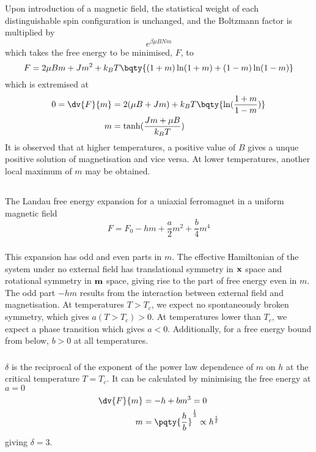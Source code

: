 \documentclass[12pt]{article}
\begin{document}
        \subsubsection{} Upon introduction of a magnetic field, the statistical weight of each distinguishable spin configuration is unchanged, and the Boltzmann factor is multiplied by \[
            e^{ \beta \mu B N m}
        \]
        which takes the free energy to be minimised, \(F\), to \[
            F = 2\mu Bm + Jm^2 + k_BT\bqty{(1 + m)\ln(1 + m) +(1 - m)\ln(1 - m)}
        \]
        which is extremised at \begin{align*}
            0 = \dv{F}{m} &= 2(\mu B + Jm) + k_BT\bqty{\ln(\frac{1 + m}{1 - m})}\\
            m &= \tanh(\frac{Jm + \mu B}{k_BT}) 
        \end{align*}
        It is observed that at higher temperatures, a positive value of \(B\) gives a unque positive solution of magnetisation and vice versa. At lower temperatures, another local maximum of \(m\) may be obtained.
        \subsection{} The Landau free energy expansion for a uniaxial ferromagnet in a uniform magnetic field  \[
            F = F_0 - hm + \frac{a}{2}m^2 + \frac{b}{4}m^4
        \]
        \subsubsection{} This expansion has odd and even parts in \(m\). The effective Hamiltonian of the system under no external field has translational symmetry in \(\bf x\) space and rotational symmetry in \(\bf m\) space, giving rise to the part of free energy even in \(m\). The odd part \( - hm\) results from the interaction between external field and magnetisation. At temperatures \(T > T_c\), we expect no spontaneously broken symmetry, which gives \(a(T > T_c) > 0\). At temperatures lower than \(T_c\), we expect a phase transition which gives \(a < 0\). Additionally, for a free energy bound from below, \(b > 0\) at all temperatures.
        \subsubsection{} \(\delta\) is the reciprocal of the exponent of the power law dependence of \(m\) on \(h\) at the critical temperature \(T = T_c\). It can be calculated by minimising the free energy at \(a = 0\)
        \begin{align*}
            \dv{F}{m} &= - h + b m^3 = 0\\
            m &=  \pqty{\frac{h}{b}}^{\frac{1}{3}} \propto h^ \frac{1}{\delta}
        \end{align*}
        giving \(\delta = 3\).
\end{document}
